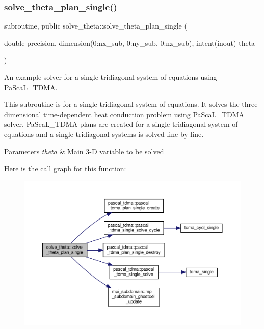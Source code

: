 \subsubsection{\texorpdfstring{solve\+\_\+theta\+\_\+plan\+\_\+single()}{solve\_theta\_plan\_single()}}
{\footnotesize\ttfamily subroutine, public solve\+\_\+theta\+::solve\+\_\+theta\+\_\+plan\+\_\+single (\begin{DoxyParamCaption}\item[{double precision, dimension(0\+:nx\+\_\+sub, 0\+:ny\+\_\+sub, 0\+:nz\+\_\+sub), intent(inout)}]{theta }\end{DoxyParamCaption})}



An example solver for a single tridiagonal system of equations using Pa\+Sca\+L\+\_\+\+T\+D\+MA. 

This subroutine is for a single tridiagonal system of equations. It solves the three-\/dimensional time-\/dependent heat conduction problem using Pa\+Sca\+L\+\_\+\+T\+D\+MA solver. Pa\+Sca\+L\+\_\+\+T\+D\+MA plans are created for a single tridiagonal system of equations and a single tridiagonal systems is solved line-\/by-\/line. 
\begin{DoxyParams}{Parameters}
{\em theta} & Main 3-\/D variable to be solved \\
\hline
\end{DoxyParams}
Here is the call graph for this function\+:
\nopagebreak
\begin{figure}[H]
\begin{center}
\leavevmode
\includegraphics[width=350pt]{namespacesolve__theta_a215d44e312ec3ab2a3ab44fa0613b100_cgraph}
\end{center}
\end{figure}
